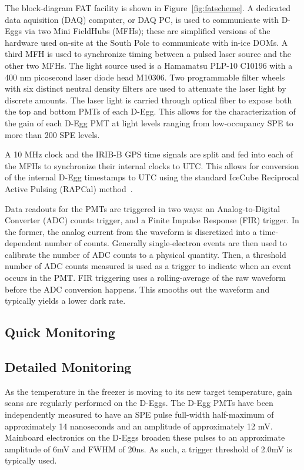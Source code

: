 \documentclass[main.tex]{subfiles}
\begin{document}
The block-diagram FAT facility is shown in Figure~\ref{fig:fatscheme}. 
A dedicated data aquisition (DAQ) computer, or DAQ PC, is used to communicate with D-Eggs via two Mini FieldHubs (MFHs); these are simplified versions of the hardware used on-site at the South Pole to communicate with in-ice DOMs. 
A third MFH is used to synchronize timing between a pulsed laser source and the other two MFHs. 
The light source used is a Hamamatsu PLP-10 C10196 with a 400 nm picosecond laser diode head M10306.
Two programmable filter wheels with six distinct neutral density filters are used to attenuate the laser light by discrete amounts. 
The laser light is carried through optical fiber to expose both the top and bottom PMTs of each D-Egg.
This allows for the characterization of the gain of each D-Egg PMT at light levels ranging from low-occupancy SPE to more than 200 SPE levels. 

A 10 MHz clock and the IRIB-B GPS time signals are split and fed into each of the MFHs to synchronize their internal clocks to UTC.
This allows for conversion of the internal D-Egg timestamps to UTC using the standard IceCube Reciprocal Active Pulsing (RAPCal) method~\cite{ABBASI2009294}.

Data readouts for the PMTs are triggered in two ways: an Analog-to-Digital Converter (ADC) counts trigger, and a Finite Impulse Response (FIR) trigger. 
In the former, the analog current from the waveform is discretized into a time-dependent number of counts. 
Generally single-electron events are then used to calibrate the number of ADC counts to a physical quantity.
Then, a threshold number of ADC counts measured is used as a trigger to indicate when an event occurs in the PMT. 
FIR triggering uses a rolling-average of the raw waveform before the ADC conversion happens. 
This smooths out the waveform and typically yields a lower dark rate.

\subsection{Quick Monitoring}

\subsection{Detailed Monitoring}

As the temperature in the freezer is moving to its new target temperature, gain scans are regularly performed on the D-Eggs. 
The D-Egg PMTs have been independently measured to have an SPE pulse full-width half-maximum of approximately 14 nanoseconds and an amplitude of approximately 12 mV. 
Mainboard electronics on the D-Eggs broaden these pulses to an approximate amplitude of 6mV and FWHM of 20ns. 
As such, a trigger threshold of 2.0mV is typically used.
\end{document}
